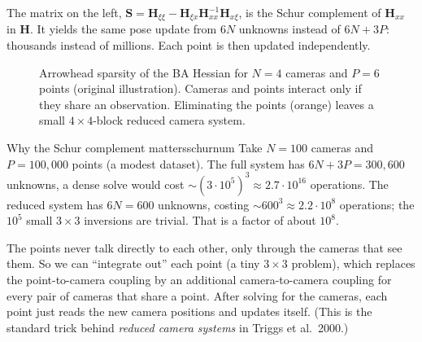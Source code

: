 \documentclass[11pt,a4paper]{article}
\begin{document}
The matrix on the left, $\bm S=\bm H_{\xi\xi}-\bm H_{\xi x}\bm H_{xx}^{-1}\bm H_{x\xi}$, is the Schur complement of $\bm H_{xx}$ in $\bm H$. It yields the same pose update from $6N$ unknowns instead of $6N+3P$: thousands instead of millions. Each point is then updated independently.

\begin{figure}[H]
\centering
{}
\caption{Arrowhead sparsity of the BA Hessian for $N=4$ cameras and $P=6$ points (original illustration). Cameras and points interact only if they share an observation. Eliminating the points (orange) leaves a small $4\times4$-block reduced camera system.}
\end{figure}

\begin{example}{Why the Schur complement matters}{schurnum}
Take $N=100$ cameras and $P=100{,}000$ points (a modest dataset). The full system has $6N+3P=300{,}600$ unknowns, a dense solve would cost $\sim(3\cdot10^5)^3\approx2.7\cdot10^{16}$ operations.
The reduced system has $6N=600$ unknowns, costing $\sim600^3\approx2.2\cdot10^8$ operations; the $10^5$ small $3\times3$ inversions are trivial.
That is a factor of about $10^8$.
\end{example}

\begin{intuition}
The points never talk directly to each other, only through the cameras that see them. So we can ``integrate out'' each point (a tiny $3\times3$ problem), which replaces the point-to-camera coupling by an additional camera-to-camera coupling for every pair of cameras that share a point. After solving for the cameras, each point just reads the new camera positions and updates itself. (This is the standard trick behind \emph{reduced camera systems} in Triggs et al.\ 2000.)
\end{intuition}
\end{document}
